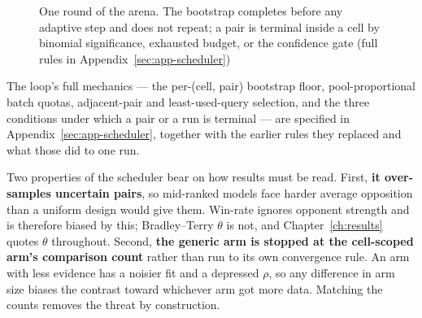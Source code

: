 \begin{figure}[htbp]
\caption[The scheduling loop]{One round of the arena. The bootstrap
completes before any adaptive step and does not repeat; a pair is
terminal inside a cell by binomial significance, exhausted budget, or
the confidence gate (full rules in
Appendix~\ref{sec:app-scheduler})}
\label{fig:scheduling}
\end{figure}

The loop's full mechanics --- the per-(cell, pair) bootstrap floor,
pool-proportional batch quotas, adjacent-pair and least-used-query
selection, and the three conditions under which a pair or a run is
terminal --- are specified in Appendix~\ref{sec:app-scheduler},
together with the earlier rules they replaced and what those did to
one run.

Two properties of the scheduler bear on how results must be read.
First, \textbf{it over-samples uncertain pairs}, so mid-ranked models
face harder average opposition than a uniform design would give them.
Win-rate ignores opponent strength and is therefore biased by this;
Bradley--Terry $\theta$ is not, and Chapter~\ref{ch:results} quotes
$\theta$ throughout. Second, \textbf{the generic arm is stopped
at the cell-scoped arm's comparison count} rather than run to its own
convergence rule. An arm with less evidence has a noisier fit and a
depressed $\rho$, so any difference in arm size biases the contrast
toward whichever arm got more data. Matching the counts removes the
threat by construction.

